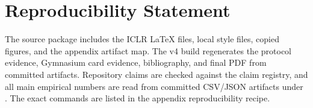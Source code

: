 \documentclass{article}
\begin{document}
\section*{Reproducibility Statement}
The source package includes the ICLR LaTeX files, local style files, copied
figures, and the appendix artifact map. The v4 build regenerates the protocol
evidence, Gymnasium card evidence, bibliography, and final PDF from committed
artifacts. Repository claims are checked against the claim registry, and all
main empirical numbers are read from committed CSV/JSON artifacts under
. The exact commands are listed in the appendix reproducibility recipe.




\appendix
\setcounter{section}{0}
\renewcommand{\thesection}{App.\arabic{section}}

\end{document}

